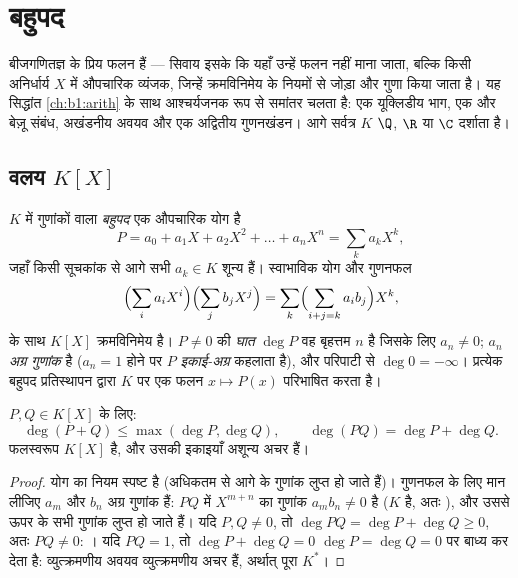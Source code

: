 \chapter{बहुपद}\label{ch:b1:poly}

 बीजगणितज्ञ के प्रिय फलन हैं --- सिवाय इसके कि यहाँ उन्हें फलन नहीं
माना जाता, बल्कि किसी अनिर्धार्य $X$ में औपचारिक व्यंजक, जिन्हें क्रमविनिमेय
 के नियमों से जोड़ा और गुणा किया जाता है। यह सिद्धांत \cref{ch:b1:arith}
के साथ आश्चर्यजनक रूप से समांतर चलता है: एक यूक्लिडीय भाग, एक  और बेज़ू संबंध, अखंडनीय अवयव और एक अद्वितीय गुणनखंडन। आगे सर्वत्र
$K$ $\Q$, $\R$ या $\C$ दर्शाता है।

\section{वलय $K[X]$}

\begin{definition}[बहुपद, घात]\label{def:b1:poly:def}
$K$ में गुणांकों वाला \emph{बहुपद} एक औपचारिक योग है
\[
P = a_0 + a_1 X + a_2 X^2 + \dots + a_n X^n
= \sum_{k} a_k X^k,
\]
जहाँ किसी सूचकांक से आगे सभी $a_k \in K$ शून्य हैं। स्वाभाविक योग और गुणनफल
\[
\Bigl(\sum_i a_i X^i\Bigr)\Bigl(\sum_j b_j X^j\Bigr)
= \sum_k \Bigl(\sum_{i+j=k} a_i b_j\Bigr) X^k,
\]
के साथ  $K[X]$ क्रमविनिमेय  है। $P \neq 0$ की \emph{घात} $\deg P$
वह बृहत्तम $n$ है जिसके लिए $a_n \neq 0$; $a_n$ \emph{अग्र गुणांक} है ($a_n
= 1$ होने पर $P$ \emph{इकाई-अग्र} कहलाता है), और
परिपाटी से $\deg 0 = -\infty$। प्रत्येक बहुपद प्रतिस्थापन द्वारा $K$ पर एक
फलन $x \mapsto P(x)$ परिभाषित करता है।
\end{definition}

\begin{proposition}[घात के नियम; पूर्णांकीय प्रांत]\label{prop:b1:poly:degree}
$P, Q \in K[X]$ के लिए:
\[
\deg(P + Q) \leq \max(\deg P, \deg Q),
\qquad
\deg(PQ) = \deg P + \deg Q .
\]
फलस्वरूप $K[X]$  है, और उसकी इकाइयाँ अशून्य अचर हैं।
\end{proposition}

\begin{proof}
योग का नियम स्पष्ट है (अधिकतम से आगे के गुणांक लुप्त हो जाते हैं)। गुणनफल के
लिए मान लीजिए $a_m$ और $b_n$ अग्र गुणांक हैं: $PQ$ में $X^{m+n}$ का गुणांक
$a_m b_n \neq 0$ है ($K$  है, अतः ), और उससे ऊपर के
सभी गुणांक लुप्त हो जाते हैं। यदि $P, Q \neq 0$, तो $\deg PQ = \deg P + \deg
Q \geq 0$, अतः $PQ \neq 0$: । यदि $PQ = 1$, तो $\deg P +
\deg Q = 0$ $\deg P = \deg Q = 0$ पर बाध्य कर देता है: व्युत्क्रमणीय अवयव
व्युत्क्रमणीय अचर हैं, अर्थात् पूरा $K^*$।
\end{proof}


